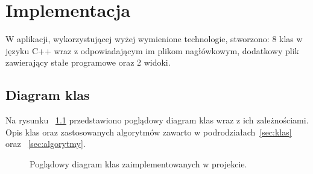 \documentclass[twoside,a4paper]{book}
\begin{document}
\chapter{Implementacja}
W aplikacji, wykorzystującej wyżej wymienione technologie, stworzono: 8 klas w języku C++ wraz z odpowiadającym im plikom nagłówkowym, dodatkowy plik zawierający stałe programowe oraz 2 widoki. 
\section{Diagram klas}
Na rysunku ~\ref{fig:classDiag} przedstawiono poglądowy diagram klas wraz z ich zależnościami.  Opis klas oraz zastosowanych algorytmów  zawarto w podrodziałach~\ref{sec:klas} oraz ~\ref{sec:algorytmy}.
\begin{figure}[!h]
		\centering
		\caption{Poglądowy diagram klas zaimplementowanych w projekcie.}
		\label{fig:classDiag}
		
\end{figure}
\end{document}
